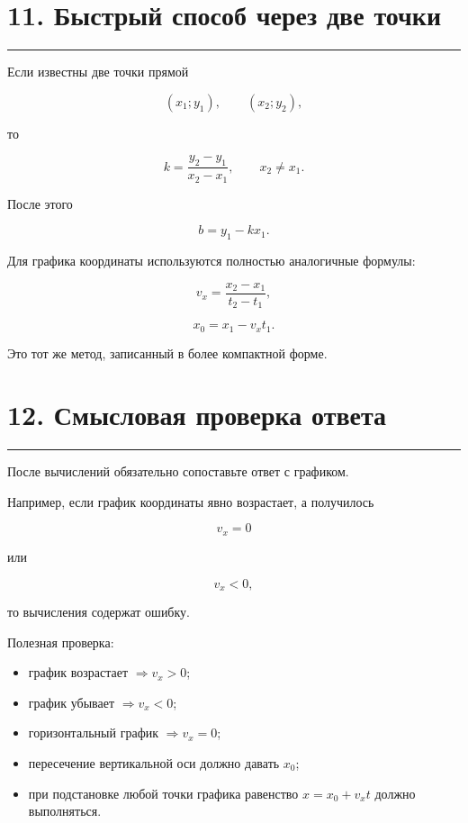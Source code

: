 \documentclass[a4paper,12pt]{article}
\newcommand{\sectionline}{%
  \par\noindent\color{accent}\rule{\linewidth}{0.5pt}\color{textgray}\par
}
\begin{document}

\section{\color{darkaccent}11. Быстрый способ через две точки}
\sectionline

Если известны две точки прямой

\[
(x_1;y_1),\qquad (x_2;y_2),
\]

то

\[
\boxed{k=\frac{y_2-y_1}{x_2-x_1}},
\qquad x_2\neq x_1.
\]

После этого

\[
\boxed{b=y_1-kx_1}.
\]

Для графика координаты используются полностью аналогичные формулы:

\[
\boxed{
v_x=\frac{x_2-x_1}{t_2-t_1}
},
\]

\[
\boxed{x_0=x_1-v_xt_1}.
\]

Это тот же метод, записанный в более компактной форме.


\section{\color{darkaccent}12. Смысловая проверка ответа}
\sectionline

После вычислений обязательно сопоставьте ответ с графиком.

Например, если график координаты явно возрастает, а получилось

\[
v_x=0
\]

или

\[
v_x<0,
\]

то вычисления содержат ошибку.

Полезная проверка:

\begin{itemize}[leftmargin=*,itemsep=0.35em]
    \item график возрастает \(\Rightarrow v_x>0\);
    \item график убывает \(\Rightarrow v_x<0\);
    \item горизонтальный график \(\Rightarrow v_x=0\);
    \item пересечение вертикальной оси должно давать \(x_0\);
    \item при подстановке любой точки графика равенство
    \(x=x_0+v_xt\) должно выполняться.
\end{itemize}
\end{document}

